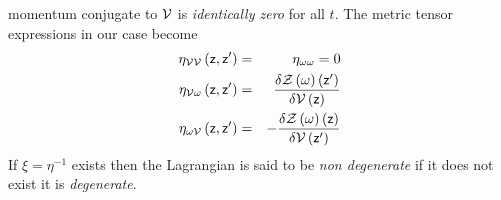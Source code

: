 momentum conjugate to ${\cal V}$ is {\em identically zero} for all $t$. The
metric tensor expressions in our case become 
\begin{eqnarray}
\eta _{{\cal VV}}\left( {\sf z,z}^{\prime }\right) &=&\eta _{{\cal \omega
\omega }}=0  \nonumber \\
\eta _{{\cal V\omega }}\left( {\sf z,z}^{\prime }\right) &=&\frac{\delta 
{\cal Z}\left( \omega \right) \left( {\sf z}^{\prime }\right) }{\delta {\cal %
V}\left( {\sf z}\right) }  \nonumber \\
\eta _{\omega {\cal V}}\left( {\sf z,z}^{\prime }\right) &=&-\frac{\delta 
{\cal Z}\left( \omega \right) \left( {\sf z}\right) }{\delta {\cal V}\left( 
{\sf z}^{\prime }\right) }
\end{eqnarray}%
If $\xi =\eta ^{-1}$ exists then the Lagrangian is said to be {\em non
degenerate }if it does not exist it is {\em degenerate}.

